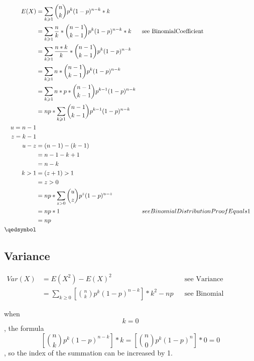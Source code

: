 \documentclass[]{book}
\begin{document}
\begin{align}
E(X) &= \sum_{k \geqslant 1} \binom{n}{k} p^k (1-p)^{n-k} * k\\
&= \sum_{k \geqslant 1} \frac{n}{k} * \binom{n-1}{k-1} p^k (1-p)^{n-k} * k && \text{see BinomialCoefficient}\\
&= \sum_{k \geqslant 1} \frac{n*k}{k} * \binom{n-1}{k-1} p^k (1-p)^{n-k}\\
&= \sum_{k \geqslant 1} n * \binom{n-1}{k-1} p^k (1-p)^{n-k}\\
&= \sum_{k \geqslant 1} n*p * \binom{n-1}{k-1} p^{k-1} (1-p)^{n-k}\\
&= np * \sum_{k \geqslant 1} \binom{n-1}{k-1} p^{k-1} (1-p)^{n-k}\\
u = n-1\\
z = k-1\\
u-z&=(n-1)-(k-1)\\
&=n-1-k+1\\
&=n-k\\
k>1&=(z+1)>1\\
&=z>0\\
&= np * \sum_{z>0} \binom{u}{z} p^{z} (1-p)^{u-z}\\
&= np * 1 && see BinomialDistributionProofEquals1\\
&= np\\
\qedsymbol
\end{align}

\subsection {Variance}

\begin{align}
	Var(X) &= E(X^2) - E(X)^2 && \text{see Variance}\\
	&= \sum_{k \geqslant 0} {[\binom{n} {k} p^k (1-p)^{n-k}]*k^2} - np && \text{see Binomial Expected Value}
\end{align}

when $$k=0$$, the formula $$[\binom{n} {k} p^k (1-p)^{n-k}] * k = [\binom{n} {0} p^k (1-p)^n] * 0 = 0$$, so the index of the summation can be increased by 1.
\end{document}

